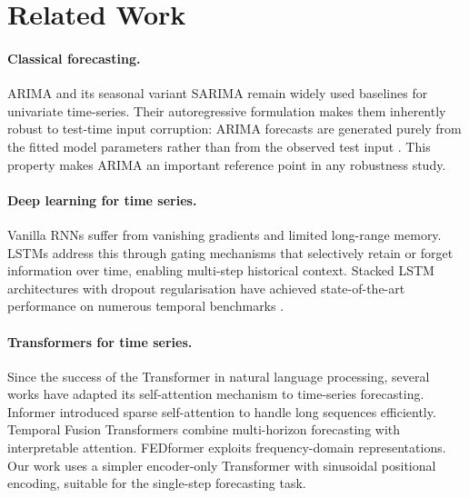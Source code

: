 \documentclass[runningheads]{llncs}
\begin{document}
\section{Related Work}
\label{sec:related}

\paragraph{Classical forecasting.}
ARIMA \cite{box1970time} and its seasonal variant SARIMA remain widely used baselines for univariate time-series. Their autoregressive formulation makes them inherently robust to test-time input corruption: ARIMA forecasts are generated purely from the fitted model parameters rather than from the observed test input \cite{hyndman2018forecasting}. This property makes ARIMA an important reference point in any robustness study.

\paragraph{Deep learning for time series.}
Vanilla RNNs suffer from vanishing gradients and limited long-range memory. LSTMs \cite{hochreiter1997long} address this through gating mechanisms that selectively retain or forget information over time, enabling multi-step historical context. Stacked LSTM architectures with dropout regularisation have achieved state-of-the-art performance on numerous temporal benchmarks \cite{greff2017lstm}.

\paragraph{Transformers for time series.}
Since the success of the Transformer \cite{vaswani2017attention} in natural language processing, several works have adapted its self-attention mechanism to time-series forecasting. Informer \cite{zhou2021informer} introduced sparse self-attention to handle long sequences efficiently. Temporal Fusion Transformers \cite{lim2021temporal} combine multi-horizon forecasting with interpretable attention. FEDformer \cite{zhou2022fedformer} exploits frequency-domain representations. Our work uses a simpler encoder-only Transformer with sinusoidal positional encoding, suitable for the single-step forecasting task.
\end{document}
